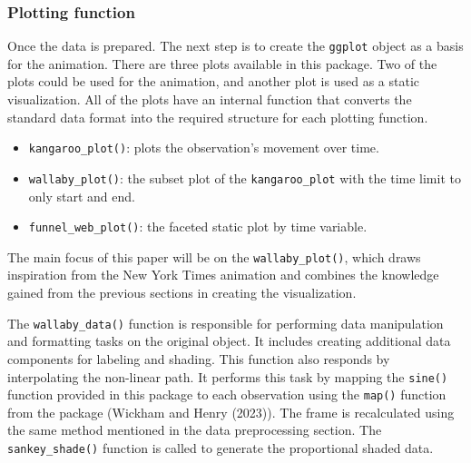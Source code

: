 \hypertarget{plotting-function}{%
\subsubsection{Plotting function}\label{plotting-function}}

Once the data is prepared. The next step is to create the \texttt{ggplot} object as a basis for the animation. There are three plots available in this package. Two of the plots could be used for the animation, and another plot is used as a static visualization. All of the plots have an internal function that converts the standard data format into the required structure for each plotting function.

\begin{itemize}
\tightlist
\item
  \texttt{kangaroo\_plot()}: plots the observation's movement over time.
\item
  \texttt{wallaby\_plot()}: the subset plot of the \texttt{kangaroo\_plot} with the time limit to only start and end.
\item
  \texttt{funnel\_web\_plot()}: the faceted static plot by time variable.
\end{itemize}

The main focus of this paper will be on the \texttt{wallaby\_plot()}, which draws inspiration from the New York Times animation and combines the knowledge gained from the previous sections in creating the visualization.

The \texttt{wallaby\_data()} function is responsible for performing data manipulation and formatting tasks on the original object. It includes creating additional data components for labeling and shading. This function also responds by interpolating the non-linear path. It performs this task by mapping the \texttt{sine()} function provided in this package to each observation using the \texttt{map()} function from the  package (Wickham and Henry (2023)). The frame is recalculated using the same method mentioned in the data preprocessing section. The \texttt{sankey\_shade()} function is called to generate the proportional shaded data.


